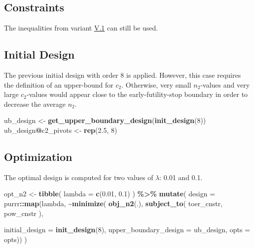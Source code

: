 \documentclass[
]{book}
\newenvironment{Shaded}{\begin{snugshade}}{\end{snugshade}}
\newcommand{\DataTypeTok}[1]{\textcolor[rgb]{0.13,0.29,0.53}{#1}}
\newcommand{\DecValTok}[1]{\textcolor[rgb]{0.00,0.00,0.81}{#1}}
\newcommand{\FloatTok}[1]{\textcolor[rgb]{0.00,0.00,0.81}{#1}}
\newcommand{\KeywordTok}[1]{\textcolor[rgb]{0.13,0.29,0.53}{\textbf{#1}}}
\newcommand{\NormalTok}[1]{#1}
\newcommand{\OperatorTok}[1]{\textcolor[rgb]{0.81,0.36,0.00}{\textbf{#1}}}
\newcommand{\StringTok}[1]{\textcolor[rgb]{0.31,0.60,0.02}{#1}}
\begin{document}
\hypertarget{constraints-13}{%
\subsection{Constraints}\label{constraints-13}}

The inequalities from variant \protect\hyperlink{variantV_1}{V.1} can still be used.

\hypertarget{initial-design-11}{%
\subsection{Initial Design}\label{initial-design-11}}

The previous initial design with order \(8\) is applied.
However, this case requires the definition of an upper-bound for \(c_2\).
Otherwise, very small \(n_2\)-values and very large \(c_2\)-values would
appear close to the early-futility-stop boundary in order to
decrease the average \(n_2\).

\begin{Shaded}
\begin{Highlighting}[]
\NormalTok{ub\_design \textless{}{-}}\StringTok{ }\KeywordTok{get\_upper\_boundary\_design}\NormalTok{(}\KeywordTok{init\_design}\NormalTok{(}\DecValTok{8}\NormalTok{))}
\NormalTok{ub\_design}\OperatorTok{@}\NormalTok{c2\_pivots \textless{}{-}}\StringTok{ }\KeywordTok{rep}\NormalTok{(}\FloatTok{2.5}\NormalTok{, }\DecValTok{8}\NormalTok{)}
\end{Highlighting}
\end{Shaded}

\hypertarget{optimization-12}{%
\subsection{Optimization}\label{optimization-12}}

The optimal design is computed for two values of \(\lambda\): 0.01 and 0.1.

\begin{Shaded}
\begin{Highlighting}[]
\NormalTok{opt\_n2 \textless{}{-}}\StringTok{ }\KeywordTok{tibble}\NormalTok{(}
  \DataTypeTok{lambda =} \KeywordTok{c}\NormalTok{(}\FloatTok{0.01}\NormalTok{, }\FloatTok{0.1}\NormalTok{)}
\NormalTok{) }\OperatorTok{\%\textgreater{}\%}
\StringTok{  }\KeywordTok{mutate}\NormalTok{(}
    \DataTypeTok{design =}\NormalTok{ purrr}\OperatorTok{::}\KeywordTok{map}\NormalTok{(lambda, }\OperatorTok{\textasciitilde{}}\KeywordTok{minimize}\NormalTok{(}
          \KeywordTok{obj\_n2}\NormalTok{(.),}
          \KeywordTok{subject\_to}\NormalTok{(}
\NormalTok{              toer\_cnstr,}
\NormalTok{              pow\_cnstr}
\NormalTok{          ),}
          
          \DataTypeTok{initial\_design =} \KeywordTok{init\_design}\NormalTok{(}\DecValTok{8}\NormalTok{), }
          \DataTypeTok{upper\_boundary\_design =}\NormalTok{ ub\_design,}
          \DataTypeTok{opts           =}\NormalTok{ opts)) }
\NormalTok{)}
\end{Highlighting}
\end{Shaded}
\end{document}
